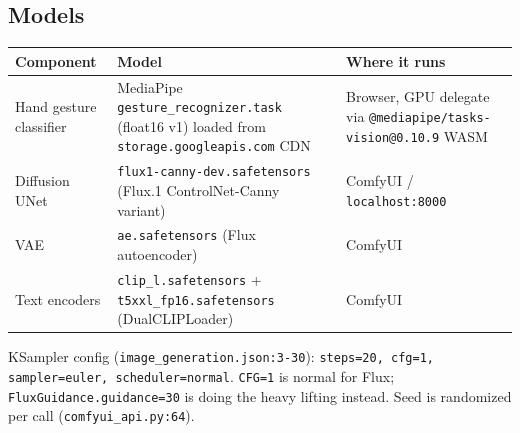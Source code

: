 \documentclass[11pt,a4paper]{article}
\begin{document}
\subsection{Models}
\begin{table}[H]
\centering
\small
\renewcommand{\arraystretch}{1.25}
\begin{tabularx}{\linewidth}{l X X}
\toprule
\textbf{Component} & \textbf{Model} & \textbf{Where it runs} \\
\midrule
Hand gesture classifier & MediaPipe \texttt{gesture\_recognizer.task} (float16 v1) loaded from \texttt{storage.googleapis.com} CDN & Browser, GPU delegate via \texttt{@mediapipe/tasks-vision@0.10.9} WASM \\
Diffusion UNet & \texttt{flux1-canny-dev.safetensors} (Flux.1 ControlNet-Canny variant) & ComfyUI / \texttt{localhost:8000} \\
VAE & \texttt{ae.safetensors} (Flux autoencoder) & ComfyUI \\
Text encoders & \texttt{clip\_l.safetensors} + \texttt{t5xxl\_fp16.safetensors} (DualCLIPLoader) & ComfyUI \\
\bottomrule
\end{tabularx}
\end{table}

\noindent KSampler config (\texttt{image\_generation.json:3-30}):
\texttt{steps=20, cfg=1, sampler=euler, scheduler=normal}. \texttt{CFG=1} is
normal for Flux; \texttt{FluxGuidance.guidance=30} is doing the heavy lifting
instead. Seed is randomized per call (\texttt{comfyui\_api.py:64}).
\end{document}
